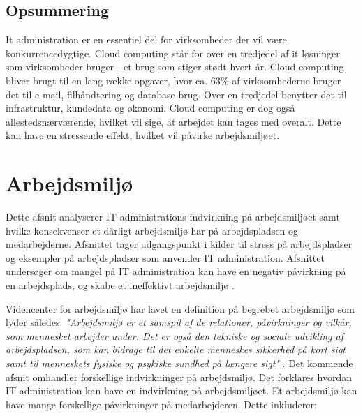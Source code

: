 \subsection{Opsummering}
It administration er en essentiel del for virksomheder der vil være konkurrencedygtige. Cloud computing står for over en tredjedel af it løsninger som virksomheder bruger - et brug som stiger stødt hvert år. Cloud computing bliver brugt til en lang række opgaver, hvor ca. 63\% af virksomhederne bruger det til e-mail, filhåndtering og database brug. Over en tredjedel benytter det til infrastruktur, kundedata og økonomi. Cloud computing er dog også allestedsnærværende, hvilket vil sige, at arbejdet kan tages med overalt. Dette kan have en stressende effekt, hvilket vil påvirke arbejdsmiljøet.







\section{Arbejdsmiljø}
Dette afsnit analyserer IT administrations indvirkning på arbejdsmiljøet samt hvilke konsekvenser et dårligt arbejdsmiljø har på arbejdspladsen og medarbejderne. Afsnittet tager udgangspunkt i kilder til stress på arbejdspladser og eksempler på arbejdspladser som anvender IT administration. Afsnittet undersøger om mangel på IT administration kan have en negativ påvirkning på en arbejdsplads, og skabe et ineffektivt arbejdsmiljø \citep{Cambridge2011}.

Videncenter for arbejdsmiljø har lavet en definition på begrebet arbejdsmiljø som lyder således: \textit{"Arbejdsmiljø er et samspil af de relationer, påvirkninger og vilkår, som mennesket arbejder under. Det er også den tekniske og sociale udvikling af arbejdspladsen, som kan bidrage til det enkelte menneskes sikkerhed på kort sigt samt til menneskets fysiske og psykiske sundhed på længere sigt"} \citep{Arbejdsmiljoe}. Det kommende afsnit omhandler forskellige indvirkninger på arbejdsmiljø. Det forklares hvordan IT administration kan have en indvirkning på arbejdsmiljøet. Et arbejdsmiljø kan have mange forskellige påvirkninger på medarbejderen. Dette inkluderer:

